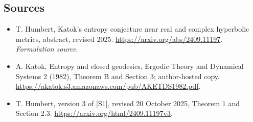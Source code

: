 \documentclass[11pt]{article}
\begin{document}
\subsection{Sources}
\begin{itemize}
\item[S1]T. Humbert, Katok's entropy conjecture near real and complex hyperbolic metrics, abstract, revised 2025.
\url{https://arxiv.org/abs/2409.11197}.
\textit{Formulation source.}
\item[S2] A. Katok, Entropy and closed geodesics, Ergodic Theory and Dynamical Systems 2 (1982), Theorem B and Section 3; author-hosted copy.
\url{https://akatok.s3.amazonaws.com/pub/AKETDS1982.pdf}.
\item[S3] T. Humbert, version 3 of [S1], revised 20 October 2025, Theorem 1 and Section 2.3.
\url{https://arxiv.org/html/2409.11197v3}.
\end{itemize}
\end{document}

